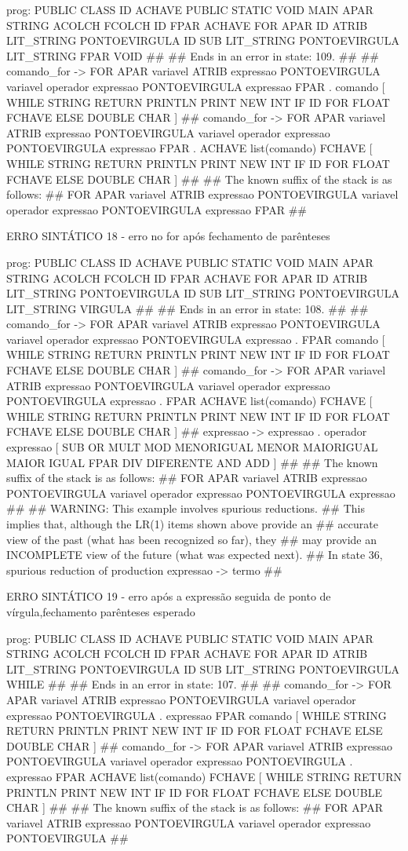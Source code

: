 \documentclass[12pt,a4paper,twoside]{report}
\begin{document}
\begin{terminal}
prog: PUBLIC CLASS ID ACHAVE PUBLIC STATIC VOID MAIN APAR STRING ACOLCH FCOLCH ID FPAR ACHAVE FOR APAR ID ATRIB LIT_STRING PONTOEVIRGULA ID SUB LIT_STRING PONTOEVIRGULA LIT_STRING FPAR VOID 
##
## Ends in an error in state: 109.
##
## comando_for -> FOR APAR variavel ATRIB expressao PONTOEVIRGULA variavel operador expressao PONTOEVIRGULA expressao FPAR . comando [ WHILE STRING RETURN PRINTLN PRINT NEW INT IF ID FOR FLOAT FCHAVE ELSE DOUBLE CHAR ]
## comando_for -> FOR APAR variavel ATRIB expressao PONTOEVIRGULA variavel operador expressao PONTOEVIRGULA expressao FPAR . ACHAVE list(comando) FCHAVE [ WHILE STRING RETURN PRINTLN PRINT NEW INT IF ID FOR FLOAT FCHAVE ELSE DOUBLE CHAR ]
##
## The known suffix of the stack is as follows:
## FOR APAR variavel ATRIB expressao PONTOEVIRGULA variavel operador expressao PONTOEVIRGULA expressao FPAR 
##

ERRO SINTÁTICO 18 -  erro no for após fechamento de parênteses

prog: PUBLIC CLASS ID ACHAVE PUBLIC STATIC VOID MAIN APAR STRING ACOLCH FCOLCH ID FPAR ACHAVE FOR APAR ID ATRIB LIT_STRING PONTOEVIRGULA ID SUB LIT_STRING PONTOEVIRGULA LIT_STRING VIRGULA 
##
## Ends in an error in state: 108.
##
## comando_for -> FOR APAR variavel ATRIB expressao PONTOEVIRGULA variavel operador expressao PONTOEVIRGULA expressao . FPAR comando [ WHILE STRING RETURN PRINTLN PRINT NEW INT IF ID FOR FLOAT FCHAVE ELSE DOUBLE CHAR ]
## comando_for -> FOR APAR variavel ATRIB expressao PONTOEVIRGULA variavel operador expressao PONTOEVIRGULA expressao . FPAR ACHAVE list(comando) FCHAVE [ WHILE STRING RETURN PRINTLN PRINT NEW INT IF ID FOR FLOAT FCHAVE ELSE DOUBLE CHAR ]
## expressao -> expressao . operador expressao [ SUB OR MULT MOD MENORIGUAL MENOR MAIORIGUAL MAIOR IGUAL FPAR DIV DIFERENTE AND ADD ]
##
## The known suffix of the stack is as follows:
## FOR APAR variavel ATRIB expressao PONTOEVIRGULA variavel operador expressao PONTOEVIRGULA expressao 
##
## WARNING: This example involves spurious reductions.
## This implies that, although the LR(1) items shown above provide an
## accurate view of the past (what has been recognized so far), they
## may provide an INCOMPLETE view of the future (what was expected next).
## In state 36, spurious reduction of production expressao -> termo 
##

ERRO SINTÁTICO 19 -  erro após a expressão seguida de ponto de vírgula,fechamento parênteses esperado

prog: PUBLIC CLASS ID ACHAVE PUBLIC STATIC VOID MAIN APAR STRING ACOLCH FCOLCH ID FPAR ACHAVE FOR APAR ID ATRIB LIT_STRING PONTOEVIRGULA ID SUB LIT_STRING PONTOEVIRGULA WHILE 
##
## Ends in an error in state: 107.
##
## comando_for -> FOR APAR variavel ATRIB expressao PONTOEVIRGULA variavel operador expressao PONTOEVIRGULA . expressao FPAR comando [ WHILE STRING RETURN PRINTLN PRINT NEW INT IF ID FOR FLOAT FCHAVE ELSE DOUBLE CHAR ]
## comando_for -> FOR APAR variavel ATRIB expressao PONTOEVIRGULA variavel operador expressao PONTOEVIRGULA . expressao FPAR ACHAVE list(comando) FCHAVE [ WHILE STRING RETURN PRINTLN PRINT NEW INT IF ID FOR FLOAT FCHAVE ELSE DOUBLE CHAR ]
##
## The known suffix of the stack is as follows:
## FOR APAR variavel ATRIB expressao PONTOEVIRGULA variavel operador expressao PONTOEVIRGULA 
##


\end{terminal}
\end{document}
